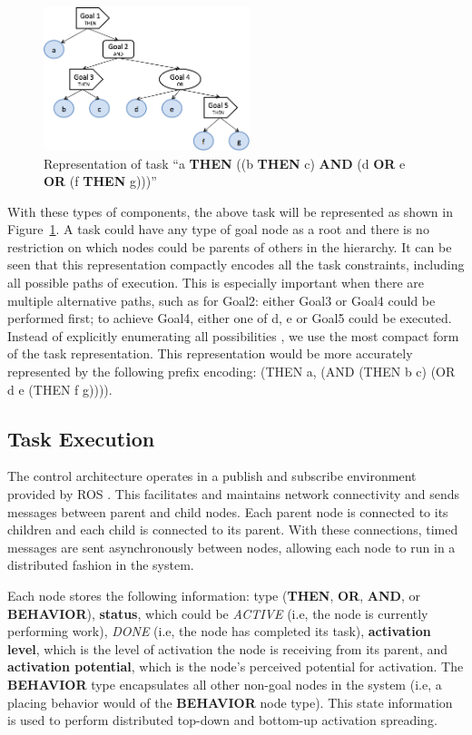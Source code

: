 \documentclass[conference]{article}
\begin{document}
\begin{figure}
\centering
  \includegraphics[width=6cm]{task_img}
\caption{Representation of task ``a {\bf THEN} ((b {\bf THEN} c) {\bf AND} (d {\bf OR} e {\bf OR} (f {\bf THEN} g)))''}
\label{fig:task_representation}       %
\end{figure}
With these types of components, the above task will be represented as shown in Figure~\ref{fig:task_representation}. A task could have any type of goal node as a root and there is no restriction on which nodes could be parents of others in the hierarchy. It can be seen that this representation compactly encodes all the task constraints, including all possible paths of execution. This is especially important when there are multiple alternative paths, such as for Goal2: either Goal3 or Goal4 could be performed first; to achieve Goal4, either one of d, e or Goal5 could be executed. Instead of explicitly enumerating all possibilities \cite{Hawkins2014}, we use the most compact form of the task representation. This representation would be more accurately represented by the following prefix encoding: (THEN a, (AND (THEN b c) (OR d e (THEN f g)))).

\subsection{Task Execution}
\label{execution}

The control architecture operates in a publish and subscribe environment provided by ROS \cite{288}. This facilitates and maintains network connectivity and sends messages between parent and child nodes. Each parent node is connected to its children and each child is connected to its parent. With these connections, timed messages are sent asynchronously between nodes, allowing each node to run in a distributed fashion in the system.

Each node stores the following information: type ({\bf THEN}, {\bf OR}, {\bf AND}, or {\bf BEHAVIOR}),
{\bf status}, which could be \emph{ACTIVE} (i.e, the node is currently performing work), \emph{DONE} (i.e, the node has completed its task), {\bf activation level}, which is the level of activation the node is receiving from its parent, 
and {\bf activation potential}, which is the node's perceived potential for activation. The {\bf BEHAVIOR} type encapsulates all other non-goal nodes in the system (i.e, a placing behavior would of the {\bf BEHAVIOR} node type).
This state information is used to perform distributed top-down and bottom-up activation spreading.
\end{document}
